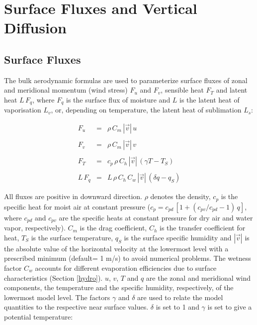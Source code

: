 %
\newcommand{\D}{\displaystyle}
%
\section{Surface Fluxes and Vertical Diffusion}

\subsection{Surface Fluxes \label{surflux}}

The bulk aerodynamic formulas are used to
parameterize surface
fluxes of zonal and meridional momentum (wind stress)
$F_u$ and
$F_v$,
sensible heat $F_T$ and latent heat $L \, F_q$, where
$F_q$ is the surface flux of moisture and $L$ is the
latent heat of vaporisation $L_v$, or, depending on
temperature, the latent heat of sublimation $L_s$:

\begin{equation}\label{fluxes}
\begin{array}{rcl}
\D F_u   & = & \D \rho \, C_m \, |\vec{v}| \, u \\
&& \\
\D F_v   & = & \D \rho \, C_m \, |\vec{v}| \, v \\
&& \\
\D F_T   & = & \D c_p \, \rho \, C_h \, |\vec{v}|  \,
(\gamma
T
- T_S )  \\
&& \\
\D L \, F_q & = & \D L\, \rho \, C_h \, C_w \, |\vec{v}|
\, 
(\delta
q -  q_S )
\end{array}
\end{equation}

All fluxes are positive
in downward  direction. $\rho$ denotes the density,
$c_p$ is the specific
heat for moist air at constant pressure ($c_p= c_{pd} \,
[1+(c_{pv}/c_{pd}-1)\, q]$, where
$c_{pd}$ and $c_{pv}$ are the specific heats at
constant pressure for dry air and water vapor,
respectively).  $C_m$ is the drag
coefficient, $C_h$ is the transfer coefficient for heat,
$T_S$ is
the surface temperature, $q_S$ is the surface specific
humidity
and $|\vec{v}|$ is the absolute value of the horizontal
velocity at the lowermost level with a prescribed  minimum 
(default= 1 m/s) to avoid numerical problems.
The wetness factor
$C_w$
accounts
for different evaporation efficiencies due to surface
characteristics (Section \ref{hydro}).  $u$, $v$,
$T$ and $q$ are the zonal and meridional wind
components, the
temperature and the specific humidity, respectively,
of the lowermost model level. The factors $\gamma$
and ${\delta}$ are used to relate  the model quantities
to
the respective near surface
values. $\delta$ is set to 1 and  $\gamma$ is set to  
give a potential temperature: 


